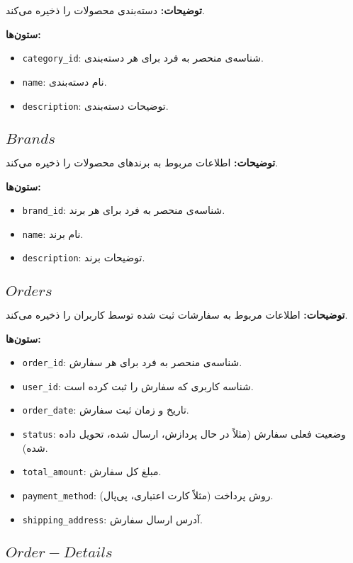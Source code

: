 \documentclass[12pt]{article}
\begin{document}
\textbf{توضیحات:} دسته‌بندی محصولات را ذخیره می‌کند.

\textbf{ستون‌ها:}
\begin{itemize}
    \item \texttt{category\_id}: شناسه‌ی منحصر به فرد برای هر دسته‌بندی.
    \item \texttt{name}: نام دسته‌بندی.
    \item \texttt{description}: توضیحات دسته‌بندی.
\end{itemize}

\subsection{\(Brands\)}

\textbf{توضیحات:} اطلاعات مربوط به برندهای محصولات را ذخیره می‌کند.

\textbf{ستون‌ها:}
\begin{itemize}
    \item \texttt{brand\_id}: شناسه‌ی منحصر به فرد برای هر برند.
    \item \texttt{name}: نام برند.
    \item \texttt{description}: توضیحات برند.
\end{itemize}

\subsection{\(Orders\)}

\textbf{توضیحات:} اطلاعات مربوط به سفارشات ثبت شده توسط کاربران را ذخیره می‌کند.

\textbf{ستون‌ها:}
\begin{itemize}
    \item \texttt{order\_id}: شناسه‌ی منحصر به فرد برای هر سفارش.
    \item \texttt{user\_id}: شناسه کاربری که سفارش را ثبت کرده است.
    \item \texttt{order\_date}: تاریخ و زمان ثبت سفارش.
    \item \texttt{status}: وضعیت فعلی سفارش (مثلاً در حال پردازش، ارسال شده، تحویل داده شده).
    \item \texttt{total\_amount}: مبلغ کل سفارش.
    \item \texttt{payment\_method}: روش پرداخت (مثلاً کارت اعتباری، پی‌پال).
    \item \texttt{shipping\_address}: آدرس ارسال سفارش.
\end{itemize}

\subsection{\(Order-Details\)}
\end{document}
